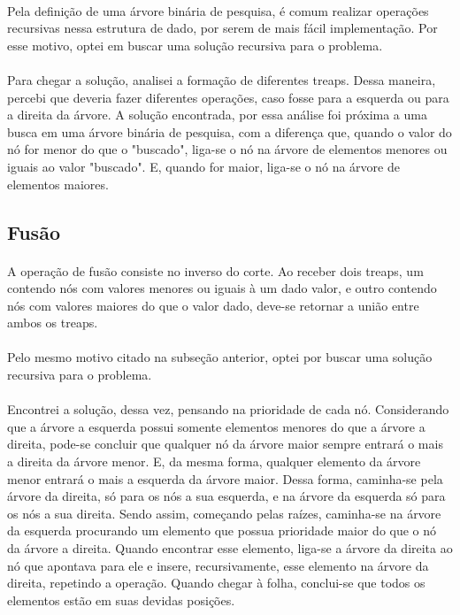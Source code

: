 \documentclass[a4paper, 12pt]{article}
\begin{document}
\paragraph{}
Pela definição de uma árvore binária de pesquisa, é comum realizar operações recursivas nessa estrutura de dado, por serem de mais fácil implementação. Por esse motivo, optei em buscar uma solução recursiva para o problema.
\paragraph{}
Para chegar a solução, analisei a formação de diferentes treaps. Dessa maneira, percebi que deveria fazer diferentes operações, caso fosse para a esquerda ou para a direita da árvore. A solução encontrada, por essa análise foi próxima a uma busca em uma árvore binária de pesquisa, com a diferença que, quando o valor do nó for menor do que o "buscado", liga-se o nó na árvore de elementos menores ou iguais ao valor "buscado". E, quando for maior, liga-se o nó na árvore de elementos maiores.


\subsection{Fusão}
\paragraph{}
A operação de fusão consiste no inverso do corte. Ao receber dois treaps, um contendo nós com valores menores ou iguais à um dado valor, e outro contendo nós com valores maiores do que o valor dado, deve-se retornar a união entre ambos os treaps.
\paragraph{}
Pelo mesmo motivo citado na subseção anterior, optei por buscar uma solução recursiva para o problema.
\paragraph{}
Encontrei a solução, dessa vez, pensando na prioridade de cada nó. Considerando que a árvore a esquerda possui somente elementos menores do que a árvore a direita, pode-se concluir que qualquer nó da árvore maior sempre entrará o mais a direita da árvore menor. E, da mesma forma, qualquer elemento da árvore menor entrará o mais a esquerda da árvore maior. Dessa forma, caminha-se pela árvore da direita, só para os nós a sua esquerda, e na árvore da esquerda só para os nós a sua direita. Sendo assim, começando pelas raízes, caminha-se na árvore da esquerda procurando um elemento que possua prioridade maior do que o nó da árvore a direita. Quando encontrar esse elemento, liga-se a árvore da direita ao nó que apontava para ele e insere, recursivamente, esse elemento na árvore da direita, repetindo a operação. Quando chegar à folha, conclui-se que todos os elementos estão em suas devidas posições.
\end{document}
